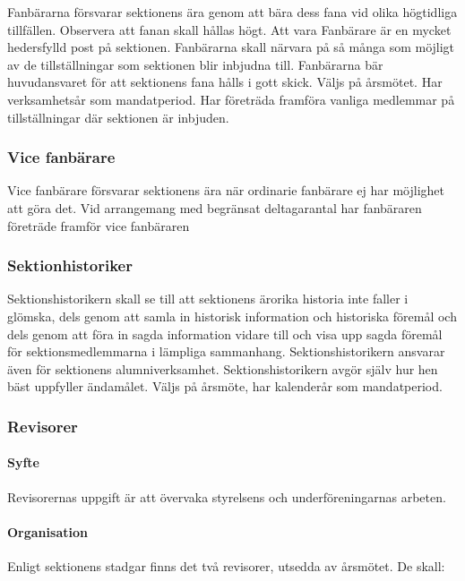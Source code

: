 \documentclass{../resources/dgovdoc}
\begin{document}
Fanbärarna försvarar sektionens ära genom att bära dess fana vid olika högtidliga tillfällen.
Observera att fanan skall hållas högt. Att vara Fanbärare är en mycket hedersfylld post på sektionen. 
Fanbärarna skall närvara på så många som möjligt av de tillställningar som sektionen blir inbjudna till.
Fanbärarna bär huvudansvaret för att sektionens fana hålls i gott skick. 
Väljs på årsmötet. Har verksamhetsår som mandatperiod. Har företräda framföra vanliga medlemmar på
tillställningar där sektionen är inbjuden.

\subsubsection{Vice fanbärare}

Vice fanbärare försvarar sektionens ära när ordinarie fanbärare ej har möjlighet att göra det. 
Vid arrangemang med begränsat deltagarantal har fanbäraren företräde framför vice fanbäraren

\subsubsection{Sektionhistoriker}

Sektionshistorikern skall se till att sektionens ärorika historia inte faller i glömska, dels genom att samla in historisk information och historiska föremål och dels genom att föra in sagda information vidare till och visa upp sagda föremål för sektionsmedlemmarna i lämpliga sammanhang. 
Sektionshistorikern ansvarar även för sektionens alumniverksamhet. 
Sektionshistorikern avgör själv hur hen bäst uppfyller ändamålet. Väljs på årsmöte, har kalenderår som mandatperiod. 

\subsubsection{Revisorer}

\paragraph{Syfte}

Revisorernas uppgift är att övervaka styrelsens och underföreningarnas arbeten.

\paragraph{Organisation}

Enligt sektionens stadgar finns det två revisorer, utsedda av årsmötet. De skall:
\end{document}
